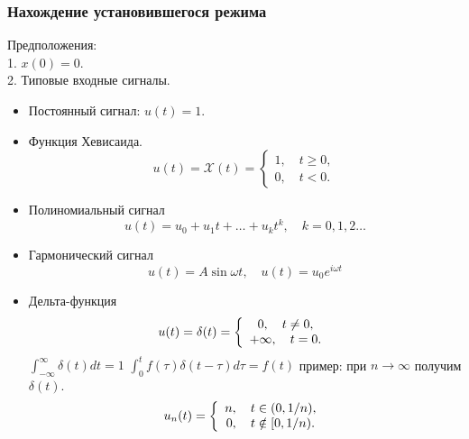 \documentclass[A4]{article}
\begin{document}
\subsubsection{Нахождение установившегося режима}
Предположения:\\
1. $x(0)=0$.\\
2. Типовые входные сигналы.
\begin{itemize}
	\item Постоянный сигнал: $u(t)=1$. 
	\item Функция Хевисаида.
	\begin{equation*}
	u(t)=\mathcal{X}(t)=\left\{\begin{array}{cc}
	1,\quad t\ge 0,\\
	0,\quad t<0.
	\end{array}\right.
	\end{equation*}
	\item Полиномиальный сигнал
	\begin{equation*}
	u(t)=u_0+u_1t+\ldots+u_kt^k, \quad k=0,1,2\ldots
	\end{equation*}
	\item Гармонический сигнал
	\begin{equation*}
	u(t)=A\sin\omega t,\quad u(t)=u_0e^{i\omega t}
	\end{equation*}
	\item Дельта-функция
	\begin{equation*}
	u(t)=\delta(t)=\left\{\begin{array}{cc}
	0,\quad t\ne 0,\\
	+\infty,\quad t=0.
	\end{array}\right.\\
	\end{equation*}
	\subitem $\int_{-\infty}^{\infty} \delta(t)dt =1$
	\subitem $\int_{0}^{t}f(\tau)\delta(t-\tau)d\tau=f(t)$
	\subitem пример: при $n\rightarrow\infty$ получим $\delta(t)$.
	\begin{equation*}
	u_n(t)=\left\{\begin{array}{cc}
	n,\quad t\in(0,1/n),\\
	0,\quad t\notin[0,1/n).
	\end{array}\right.\\
	\end{equation*}
\end{itemize}
\end{document}
